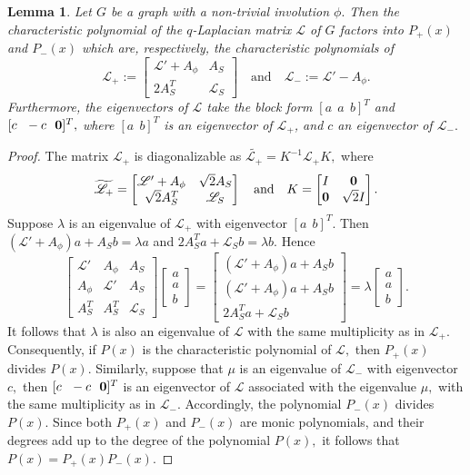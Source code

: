 \documentclass[12pt,a4paper]{article}
\newtheorem{lem}{Lemma}
\def \o {{\bf 0}}
\begin{document}
\begin{lem} \label{L1}
 Let $G$ be a graph with a non-trivial involution $\phi.$ Then the characteristic polynomial of the $q$-Laplacian matrix $\mathscr{L}$ of $G$ factors into $P_+(x)$ and $P_-(x)$ which are, respectively, the characteristic polynomials of $$\mathscr{L}_+:=\begin{bmatrix}
		\mathscr{L}'+A_\phi& A_S\\
		2A_S^T &\mathscr{L}_S
	\end{bmatrix}\quad \text{and}\quad \mathscr{L}_-:=\mathscr{L}'-A_\phi.$$
Furthermore, the eigenvectors of $\mathscr{L}$ take the block form $[a~~a~~b]^T$ and $[c~~ -c~~ \o]^T,$ where $[a~~ b]^T$ is an eigenvector of $\mathscr{L}_+$, and $c$ an eigenvector of $\mathscr{L}_-.$ 
 \end{lem}
 \begin{proof}
The matrix $\mathscr{L}_+$ is diagonalizable as  $\widetilde{\mathscr{L}_+}= K^{-1}\mathscr{L}_+ K,$ where $$\widetilde{\mathscr{L}_+}=\begin{bmatrix}
		\mathscr{L}'+A_\phi&\sqrt{2} A_S\\
		\sqrt{2}A_S^T & \mathscr{L}_S
\end{bmatrix}\quad \text{and} \quad K=\begin{bmatrix}
		I& \o\\
		\o & \sqrt{2}I
	\end{bmatrix}. $$ 
Suppose $\lambda$ is an eigenvalue of $\mathscr{L}_+$ with eigenvector $[a~~ b]^T$. Then $(\mathscr{L}'+A_\phi)a+A_Sb=\lambda a$ and $2A_S^Ta+\mathscr{L}_Sb=\lambda b.$ Hence
$$\begin{bmatrix}
		\mathscr{L}'& A_\phi& A_S\\
		A_\phi &\mathscr{L}' &A_S\\
		A_S^T & A_S^T & \mathscr{L}_S  
\end{bmatrix}\begin{bmatrix}
		a\\a\\b
	\end{bmatrix}=\begin{bmatrix}
		(\mathscr{L}'+A_\phi)a+A_Sb\\
		(\mathscr{L}'+A_\phi)a+A_Sb\\
		2A_S^Ta+\mathscr{L}_Sb
	\end{bmatrix}=\lambda \begin{bmatrix}
		a\\a\\b  
	\end{bmatrix}.$$  
It follows that $\lambda$ is also an eigenvalue of $\mathscr{L}$ with the same multiplicity as in $\mathscr{L}_+$. Consequently, if $P(x)$ is the characteristic polynomial of $\mathscr{L},$ then $P_+(x)$ divides $P(x).$ Similarly, suppose that $\mu$ is an eigenvalue of $\mathscr{L}_{-}$ with eigenvector $c,$ then $[c~~ -c~~ \o]^T$ is an eigenvector of $\mathscr{L}$ associated with the eigenvalue $\mu,$ with the same multiplicity as in $\mathscr{L}_{-}$. Accordingly, the polynomial $P_-(x)$ divides $P(x).$ Since both $P_+(x)$ and $P_-(x)$ are monic polynomials, and their degrees add up to the degree of the polynomial $P(x),$ it follows that $P(x)= P_+(x) P_-(x).$
\end{proof}
\end{document}
